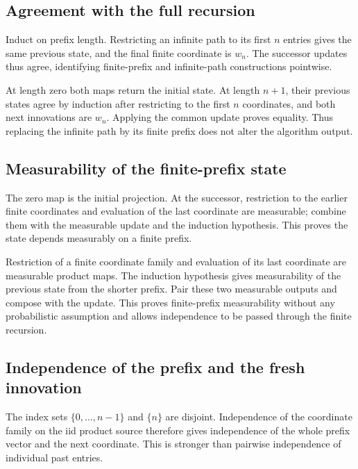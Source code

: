 \documentclass[11pt,a4paper]{article}
\begin{document}
\subsection{\texorpdfstring{Agreement with the full recursion}{Agreement with the full recursion}}


Induct on prefix length. Restricting an infinite path to its first \(n\) entries gives the same previous state, and the final finite coordinate is \(w_n\). The successor updates thus agree, identifying finite-prefix and infinite-path constructions pointwise.



At length zero both maps return the initial state. At length \(n+1\), their previous states agree by induction after restricting to the first \(n\) coordinates, and both next innovations are \(w_n\). Applying the common update proves equality. Thus replacing the infinite path by its finite prefix does not alter the algorithm output.


\subsection{\texorpdfstring{Measurability of the finite-prefix state}{Measurability of the finite-prefix state}}


The zero map is the initial projection. At the successor, restriction to the earlier finite coordinates and evaluation of the last coordinate are measurable; combine them with the measurable update and the induction hypothesis. This proves the state depends measurably on a finite prefix.



Restriction of a finite coordinate family and evaluation of its last coordinate are measurable product maps. The induction hypothesis gives measurability of the previous state from the shorter prefix. Pair these two measurable outputs and compose with the update. This proves finite-prefix measurability without any probabilistic assumption and allows independence to be passed through the finite recursion.


\subsection{\texorpdfstring{Independence of the prefix and the fresh innovation}{Independence of the prefix and the fresh innovation}}


The index sets \(\{0,\ldots,n-1\}\) and \(\{n\}\) are disjoint. Independence of the coordinate family on the iid product source therefore gives independence of the whole prefix vector and the next coordinate. This is stronger than pairwise independence of individual past entries.
\end{document}
